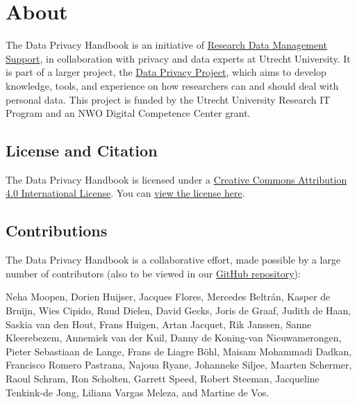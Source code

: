 \documentclass[
]{book}
\begin{document}
\hypertarget{about}{%
\section{About}\label{about}}

The Data Privacy Handbook is an initiative of
\href{https://www.uu.nl/en/research/research-data-management}{Research Data Management Support},
in collaboration with privacy and data experts at
Utrecht University. It is part of a larger project, the
\href{https://utrechtuniversity.github.io/dataprivacyproject}{Data Privacy Project},
which aims to develop knowledge, tools, and experience
on how researchers can and should deal with personal data. This project is
funded by the Utrecht University Research IT Program and an NWO Digital
Competence Center grant.

\hypertarget{license-and-citation}{%
\subsection{License and Citation}\label{license-and-citation}}

The Data Privacy Handbook is licensed under a
\href{https://creativecommons.org/licenses/by/4.0/}{Creative Commons Attribution 4.0 International License}.
You can \href{https://github.com/UtrechtUniversity/dataprivacyhandbook/blob/main/LICENSE.md}{view the license here}.

\hypertarget{contributions}{%
\subsection{Contributions}\label{contributions}}

The Data Privacy Handbook is a collaborative effort, made possible by a large
number of contributors (also to be viewed in our
\href{https://github.com/UtrechtUniversity/dataprivacyhandbook}{GitHub repository}):

Neha Moopen, Dorien Huijser, Jacques Flores, Mercedes Beltrán, Kasper de Bruijn,
Wies Cipido, Ruud Dielen, David Gecks, Joris de Graaf, Judith de Haan,
Saskia van den Hout, Frans Huigen, Artan Jacquet, Rik Janssen, Sanne Kleerebezem,
Annemiek van der Kuil, Danny de Koning-van Nieuwamerongen,
Pieter Sebastiaan de Lange, Frans de Liagre Böhl, Maisam Mohammadi Dadkan,
Francisco Romero Pastrana, Najoua Ryane, Johanneke Siljee, Maarten Schermer, Raoul Schram,
Ron Scholten, Garrett Speed, Robert Steeman, Jacqueline Tenkink-de Jong,
Liliana Vargas Meleza, and Martine de Vos.
\end{document}
